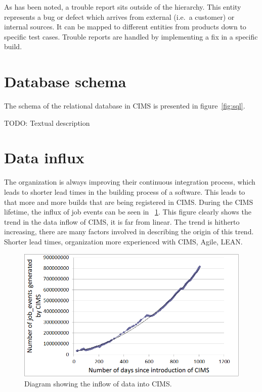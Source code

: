 As has been noted, a trouble report sits outside of the hierarchy. This entity represents a bug or defect which arrives from external (i.e.\ a customer) or internal sources. It can be mapped to different entities from products down to specific test cases. Trouble reports are handled by implementing a fix in a specific build.

\section{Database schema}
The schema of the relational database in CIMS is presented in figure~\ref{fig:sql}.

TODO: Textual description

\section{Data influx}

The organization is always improving their continuous integration process, which leads to shorter lead times in the building process of a software. This leads to that more and more builds that are being registered in CIMS. During the CIMS lifetime, the influx of job events can be seen in ~\ref{fig:jeTrend}. This figure clearly shows the trend in the data inflow of CIMS, it is far from linear. The trend is hitherto increasing, there are many factors involved in describing the origin of this trend. Shorter lead times, organization more experienced with CIMS, Agile, LEAN.

\begin{figure}[h!]
\centering
\includegraphics[scale=0.65]{figure/jeTrends.png}
\caption{Diagram showing the inflow of data into CIMS.}
\label{fig:jeTrend}
\end{figure}

